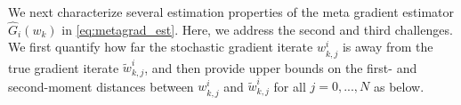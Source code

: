 \documentclass{osudissert96}
\begin{document}

We next characterize several estimation properties of  the meta gradient estimator  $\widehat G_i(w_k)$ in \cref{eq:metagrad_est}. 
Here, we address the second and third challenges.  We first quantify how far  the stochastic gradient iterate $w_{k,j}^i$ is away from the true gradient iterate $\widetilde w_{k,j}^i$, and then provide upper bounds on the first- and second-moment distances between $w_{k,j}^i$ and $\widetilde w_{k,j}^i$ for all { $j= 0,..., N$} as below. 
\end{document}
